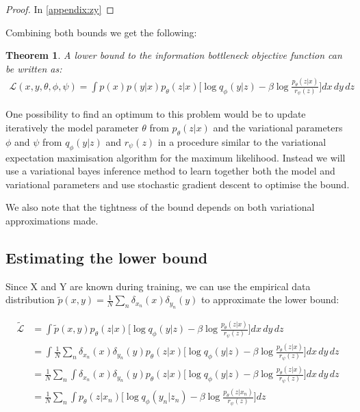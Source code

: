 \documentclass[11pt,oneside,openright]{report}
\newtheorem{theorem}{Theorem}
\begin{document}
\begin{proof} In \ref{appendix:zy}\end{proof}

Combining both bounds we get the following:
\begin{theorem}
A lower bound to the information bottleneck objective function can be written as:
 \begin{align}
\mathcal{L}(x, y, \theta, \phi, \psi) = \int p(x) p(y|x) p_\theta(z|x) \Big[ \log q_\phi(y|z) - \beta  \log \frac{p_\theta(z|x)}{r_\psi(z)}\Big] dx\, dy\, dz
\end{align}
\end{theorem}

One possibility to find an optimum to this problem would be to update iteratively the model parameter $\theta$ from $p_\theta(z|x)$  and the variational parameters $\phi$ and $\psi$ from $q_\phi(y|z)$ and $r_\psi(z)$ in a procedure similar to the variational expectation maximisation algorithm \cite{vem} for the maximum likelihood. Instead we will use a variational bayes inference method to learn together both the model and variational parameters and use stochastic gradient descent to optimise the bound.

We also note that the tightness of the bound depends on both variational approximations made.

\subsection{Estimating the lower bound}
Since X and Y are known during training, we can use the empirical data distribution $\tilde{p}(x, y) = \frac{1}{N}\sum_n\delta_{x_n}(x)\delta_{y_n}(y)$ to approximate the lower bound:

 \begin{align}
\tilde{\mathcal{L}} & = \int \tilde{p}(x, y) p_\theta(z|x) \Big[\log q_\phi(y|z) - \beta \log \frac{p_\theta(z|x)}{r_\psi(z)} \Big]dx\, dy\, dz  \\
   & = \int \frac{1}{N}\sum_n\delta_{x_n}(x)\delta_{y_n}(y) p_\theta(z|x) \Big[\log q_\phi(y|z) - \beta \log \frac{p_\theta(z|x)}{r_\psi(z)} \Big] dx\, dy\, dz \\
   & = \frac{1}{N}\sum_n \int \delta_{x_n}(x)\delta_{y_n}(y) p_\theta(z|x) \Big[ \log q_\phi(y|z) - \beta \log \frac{p_\theta(z|x)}{r_\psi(z)}\Big ] dx\, dy\, dz \\
   & = \frac{1}{N}\sum_n \int p_\theta(z|x_n) \Big[  \log q_\phi(y_n|z_n) - \beta   \log \frac{p_\theta(z|x_n)}{r_\psi(z)} \Big] dz \label{eq:lower}
\end{align}
\end{document}
